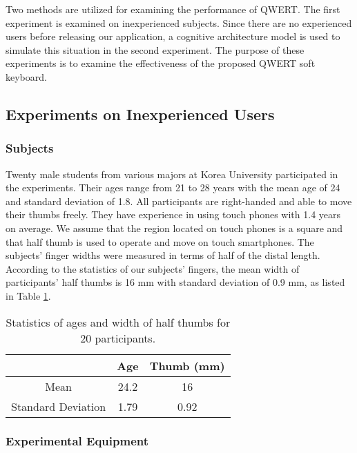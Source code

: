 \documentclass{singlecol-new}
\theoremstyle{TH}{
\newtheorem{lemma}{Lemma}
\newtheorem{theorem}[lemma]{Theorem}
\newtheorem{corrolary}[lemma]{Corrolary}
\newtheorem{conjecture}[lemma]{Conjecture}
\newtheorem{proposition}[lemma]{Proposition}
\newtheorem{claim}[lemma]{Claim}
\newtheorem{stheorem}[lemma]{Wrong Theorem}
\newtheorem{algorithm}{Algorithm}
}
\theoremstyle{THrm}{
\newtheorem{definition}{Definition}[section]
\newtheorem{question}{Question}[section]
\newtheorem{remark}{Remark}
\newtheorem{scheme}{Scheme}
}
\theoremstyle{THhit}{
\newtheorem{case}{Case}[section]
}
\begin{document}
Two methods are utilized for examining the performance of QWERT. The first experiment is examined on inexperienced subjects. Since there are no experienced users before releasing our application, a cognitive architecture model is used to simulate this situation in the second experiment. The purpose of these experiments is to examine the effectiveness of the proposed QWERT soft keyboard. \\

\subsection{Experiments on Inexperienced Users}

\subsubsection{Subjects}

Twenty male students from various majors at Korea University participated in the experiments. Their ages range from 21 to 28 years with the mean age of 24 and standard deviation of 1.8. All participants are right-handed and able to move their thumbs freely. They have experience in using touch phones with 1.4 years on average. We assume that the region located on touch phones is a square and that half thumb is used to operate and move on touch smartphones. The subjects' finger widths were measured in terms of half of the distal length. According to the statistics of our subjects' fingers, the mean width of participants' half thumbs is 16 mm with standard deviation of 0.9 mm, as listed in Table \ref{tab.sub}. \\

\begin{table}
\centering
\caption{Statistics of ages and width of half thumbs for 20 participants.}\label{tab.sub}
\begin{tabular}{ccc}
  \hline
& Age & Thumb (mm) \\
  \hline
  Mean & 24.2 & 16 \\
  Standard Deviation & 1.79 & 0.92 \\
  \hline
\end{tabular}
\end{table}

\subsubsection{Experimental Equipment}
\end{document}
